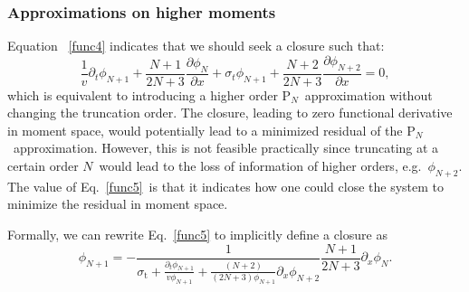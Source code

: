 \documentclass[review]{elsarticle}
\newcommand{\pn}{P$_N$}
\newcommand{\ppz}{\partial_x}%
\newcommand{\psii}[1]{\phi_\ensuremath{{#1}}}
\begin{document}
\subsubsection{Approximations on higher moments}
Equation ~\eqref{func4} indicates that we should seek a closure such that:
\begin{equation}\label{func5}
\frac{1}{v}\partial_t\phi_{N+1}+\frac{N+1}{2N+3}\frac{\partial\phi_{N}}{\partial x}
+\sigma_{t}\phi_{N+1}+\frac{N+2}{2N+3}\frac{\partial\phi_{N+2}}{\partial x}=0,
\end{equation}
which is equivalent to introducing a higher order \pn~approximation without changing the truncation order. The closure, leading to zero functional derivative in moment space, would potentially lead to a minimized residual of the \pn~approximation. However, this is not feasible practically since truncating at a certain order $N$~would lead to the loss of information of higher orders, e.g.~$\psii{N+2}$. The value of Eq.~\eqref{func5}~is that it indicates how one could close the system to minimize the residual in moment space.

Formally, we can rewrite Eq.~\eqref{func5} to implicitly define a closure as
\begin{equation}\label{oricl}
\psii{N+1}=-\frac{1}{\sigma_\mathrm{t}+\displaystyle\frac{\partial_t\psii{N+1}}{v\psii{N+1}}+\frac{(N+2)}{(2N+3)\psii{N+1}}\ppz\psii{N+2}}\frac{N+1}{2N+3}\ppz\psii{N}.
\end{equation}
\end{document}
